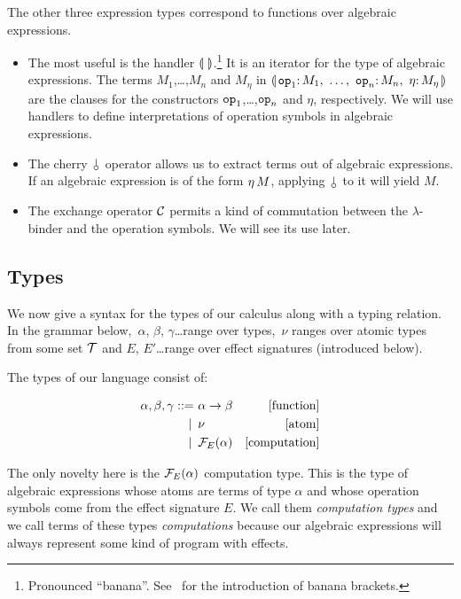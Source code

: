 \documentclass{llncs}
\newcommand{\negSpaceBeforeAlign}{\vspace{-4mm}}
\begin{document}
The other three expression types correspond to functions over algebraic
expressions.
\begin{itemize}
\item The most useful is the handler $\llparenthesis \,  \, \rrparenthesis$.\footnote{Pronounced
  ``banana''. See~\cite{meijer1991functional} for the introduction of
  banana brackets.} It is an iterator for the type of algebraic
  expressions. The terms $M_1$,\ldots,$M_n$ and $M_\eta$ in $\cdbanana$ are
  the clauses for the constructors $\mathtt{op}_1$,\ldots,$\mathtt{op}_n$ and
  $\eta$, respectively. We will use handlers to define interpretations of
  operation symbols in algebraic expressions.
\item The cherry $\cherry$ operator allows us to extract terms out of
  algebraic expressions. If an algebraic expression is of the form
  $\eta\,M$, applying $\cherry$ to it will yield $M$.
\item The exchange operator $\mathcal{C}$ permits a kind of commutation between the
  $\lambda$-binder and the operation symbols. We will see its use later.
\end{itemize}


\subsection{Types}
\label{ssec:types}

We now give a syntax for the types of our calculus along with a typing
relation. In the grammar below,\, $\alpha$, $\beta$, $\gamma$\ldots range
over types,\, $\nu$ ranges over atomic types from some set $\mathcal{T}$ and $E$,
$E'$\ldots range over effect signatures (introduced below).

The types of our language consist of:

\negSpaceBeforeAlign

\begin{align*}
  \alpha, \beta, \gamma ::= &\ \alpha \to \beta & \mbox{[function]} \\
   | \, &\ \nu & \mbox{[atom]} \\
   | \, &\ \mathcal{F}_E(\alpha) & \mbox{[computation]}
\end{align*}

The only novelty here is the $\mathcal{F}_E(\alpha)$ computation type. This is the
type of algebraic expressions whose atoms are terms of type $\alpha$ and
whose operation symbols come from the effect signature $E$. We call them
\emph{computation types} and we call terms of these types
\emph{computations} because our algebraic expressions will always represent
some kind of program with effects.
\end{document}
